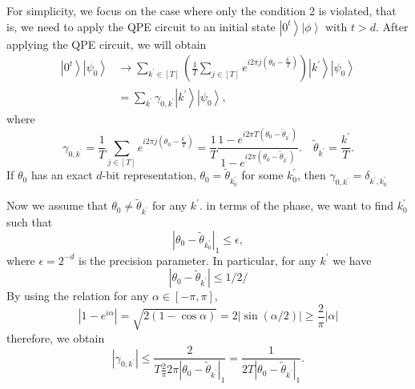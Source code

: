 \documentclass[11pt]{article}
\newcommand{\ket}[1]{\left|#1\right\rangle}
\begin{document}
For simplicity, we focus on the case where only the condition 2 is violated, that is, we need to apply the QPE circuit to an initial state $\ket{0^t}\ket{\phi}$ with $t > d$. After applying the QPE circuit, we will obtain 
\begin{align}
    \ket{0^t}\ket{\psi_0} &\rightarrow \sum_{k^{'}\in[T]}\left(\frac{1}{T}\sum_{j\in [T] }e^{i2\pi j\left(\theta_0 - \frac{k^{'}}{T}\right)}\right)\ket{k^{'}}\ket{\psi_0} \nonumber \\
    &= \sum_{k^{'}}\gamma_{0,k^{'}}\ket{k^{'}}\ket{\psi_0},
\end{align}
where 
\begin{equation}
    \gamma_{0,k^{'}} = \frac{1}{T}\sum_{j\in[T]}e^{i2\pi j\left(\theta_0 - \frac{k^{'}}{T}\right)} = \frac{1}{T}\frac{1 - e^{i2\pi T(\theta_0 - \tilde{\theta}_{k^{'}})}}{1 - e^{i2\pi (\theta_0 - \tilde{\theta}_{k^{'}})}}. \quad \tilde{\theta}_{k^{'}} = \frac{k^{'}}{T}.
\end{equation}
If $\theta_0$ has an exact $d$-bit representation, $\theta_0 = \tilde{\theta}_{k_0^{'}}$ for some $k_0^{'}$, then $\gamma_{0,k^{'}} = \delta_{k^{'},k_0^{'}}$

Now we assume that $\theta_0 \neq \tilde{\theta}_{k^{'}}$ for any $k^{'}$. in terms of the phase, we want to find $k_{0}^{'}$ such that 
\begin{equation}
    |\theta_0 - \tilde{\theta}_{k_0^{'}}|_1 \leq \epsilon,
\end{equation}
where $\epsilon = 2^{-d}$ is the precision parameter. In particular, for  any $k^{'}$ we have 
\begin{equation}
    |\theta_0 - \tilde{\theta}_{k^{'}}| \leq 1/2/ 
\end{equation}
By using the relation for any $\alpha \in [-\pi, \pi]$,
\begin{equation}
    |1 - e^{i\alpha}| = \sqrt{2(1-\cos\alpha)} = 2|\sin(\alpha/2)| \geq \frac{2}{\pi}|\alpha|
\end{equation}
therefore, we obtain 
\begin{equation}
    |\gamma_{0,k^{'}}| \leq \frac{2}{T\frac{2}{\pi}2\pi|\theta_0 - \tilde{\theta}_{k^{'}}|_1} = \frac{1}{2T|\theta_0 - \tilde{\theta}_{k^{'}}|_1}.
\end{equation}
\end{document}
